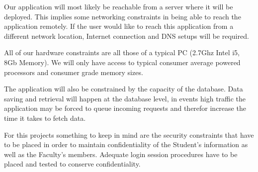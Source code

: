 
\label{constraints}

Our application will most likely be reachable from a server where it will be deployed. This implies some networking constraints in being able to reach the application remotely. If the user would like to reach this application from a different network location, Internet connection and DNS setups will be required. 

All of our hardware constraints are all those of a typical PC (2.7Ghz Intel i5, 8Gb Memory). We will only have access to typical consumer average powered processors and consumer grade memory sizes.

The application will also be constrained by the capacity of the database. Data saving and retrieval will happen at the database level, in events high traffic the application may be forced to queue incoming requests and therefor increase the time it takes to fetch data.

For this projects something to keep in mind are the security constraints that have to be placed in order to maintain confidentiality of the Student’s information as well as the Faculty’s members. Adequate login session procedures have to be placed and tested to conserve confidentiality.
